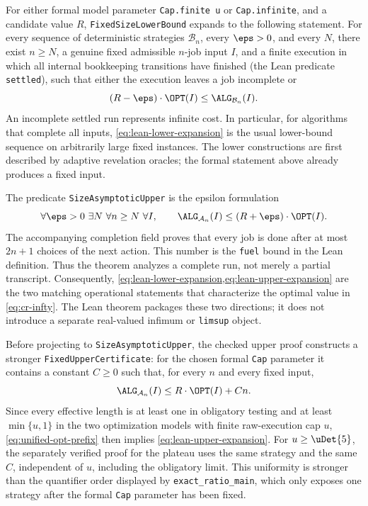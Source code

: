 For either formal model parameter \texttt{Cap.finite u} or
\texttt{Cap.infinite}, and a candidate value \(R\),
\texttt{FixedSizeLowerBound} expands to the following statement.  For every
sequence of deterministic strategies \(\mathcal B_n\), every
\(\eps>0\), and every \(N\), there exist \(n\ge N\), a genuine fixed
admissible \(n\)-job input \(I\), and a finite execution in which all internal
bookkeeping transitions have finished (the Lean predicate
\texttt{settled}), such that
either the execution leaves a job incomplete or
\begin{equation}
  (R-\eps)\cdot\OPT(I)\le \ALG_{\mathcal B_n}(I).
  \label{eq:lean-lower-expansion}
\end{equation}
An incomplete settled run represents infinite cost.  In particular, for
algorithms that complete all inputs, \eqref{eq:lean-lower-expansion} is the
usual lower-bound sequence on arbitrarily large fixed instances.  The lower
constructions are first described by adaptive revelation oracles; the formal
statement above already produces a fixed input.

The predicate \texttt{SizeAsymptoticUpper} is the epsilon formulation
\begin{equation}
 \forall\eps>0\ \exists N\ \forall n\ge N\ \forall I,\qquad
 \ALG_{\mathcal A_n}(I)\le (R+\eps)\cdot\OPT(I).
 \label{eq:lean-upper-expansion}
\end{equation}
The accompanying completion field proves that every job is done after at
most \(2n+1\) choices of the next action.  This number is the \texttt{fuel}
bound in the Lean definition.  Thus the theorem analyzes a complete run,
not merely a partial transcript.  Consequently,
\cref{eq:lean-lower-expansion,eq:lean-upper-expansion} are the two matching
operational statements that characterize the optimal value in
\cref{eq:cr-infty}.  The Lean theorem packages these two directions; it does
not introduce a separate real-valued infimum or \texttt{limsup} object.

Before projecting to \texttt{SizeAsymptoticUpper}, the checked upper proof
constructs a stronger \texttt{FixedUpperCertificate}: for the chosen formal
\texttt{Cap} parameter it
contains a constant \(C\ge0\) such that, for every \(n\) and every fixed
input,
\begin{equation}
  \ALG_{\mathcal A_n}(I)\le R\cdot\OPT(I)+Cn.
  \label{eq:lean-linear-certificate}
\end{equation}
Since every effective length is at least one in obligatory testing and at
least $\min\{u,1\}$ in the two optimization models with finite
raw-execution cap $u$,
\cref{eq:unified-opt-prefix} then implies
\eqref{eq:lean-upper-expansion}.  For \(u\ge\uDet{5}\), the separately verified
proof for the plateau uses the same strategy and the same \(C\), independent
of \(u\), including the obligatory limit.  This uniformity is stronger
than the quantifier order displayed by \texttt{exact\_ratio\_main}, which
only exposes one strategy after the formal \texttt{Cap} parameter has been
fixed.

